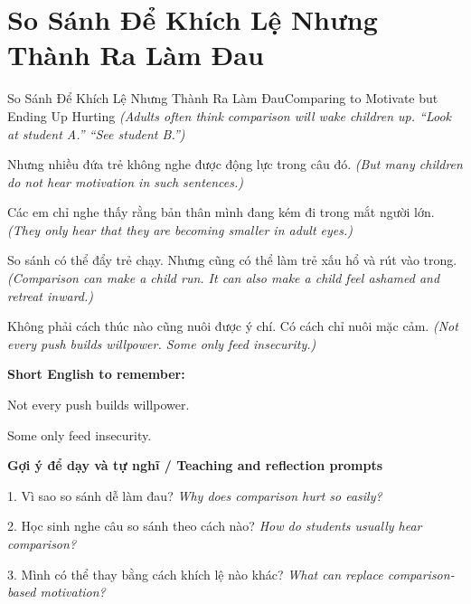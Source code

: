 \section{So Sánh Để Khích Lệ Nhưng Thành Ra Làm Đau}
\begin{truyen}{So Sánh Để Khích Lệ Nhưng Thành Ra Làm Đau}{Comparing to Motivate but Ending Up Hurting}
\textit{(Adults often think comparison will wake children up. “Look at student A.” “See student B.”)}

Nhưng nhiều đứa trẻ không nghe được động lực trong câu đó.
\textit{(But many children do not hear motivation in such sentences.)}

Các em chỉ nghe thấy rằng bản thân mình đang kém đi trong mắt người lớn.
\textit{(They only hear that they are becoming smaller in adult eyes.)}

So sánh có thể đẩy trẻ chạy. Nhưng cũng có thể làm trẻ xấu hổ và rút vào trong.
\textit{(Comparison can make a child run. It can also make a child feel ashamed and retreat inward.)}

\end{truyen}

\begin{baihoc}
Không phải cách thúc nào cũng nuôi được ý chí. Có cách chỉ nuôi mặc cảm.
\textit{(Not every push builds willpower. Some only feed insecurity.)}
\end{baihoc}

\begin{ghinhoanh}
\textbf{Short English to remember:}

Not every push builds willpower.

Some only feed insecurity.

\end{ghinhoanh}

\begin{tuhocnhanh}
\textbf{Gợi ý để dạy và tự nghĩ / Teaching and reflection prompts}

1. Vì sao so sánh dễ làm đau? \textit{Why does comparison hurt so easily?}

2. Học sinh nghe câu so sánh theo cách nào? \textit{How do students usually hear comparison?}

3. Mình có thể thay bằng cách khích lệ nào khác? \textit{What can replace comparison-based motivation?}
\end{tuhocnhanh}
\ngancach

